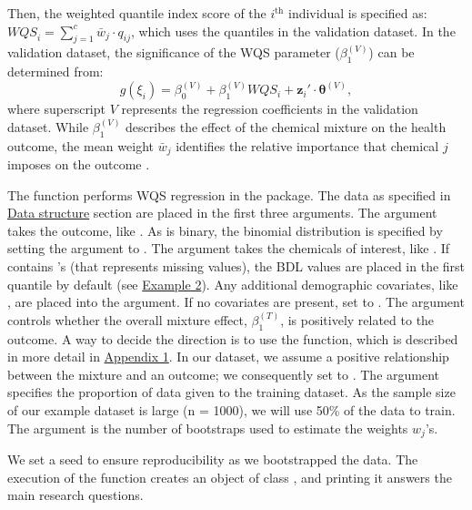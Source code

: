 Then, the weighted quantile index score of the \(i^{\text{th}}\)
individual is specified as:
\({WQS}_{i} = \sum_{j=1}^{c} \bar w_j \cdot q_{ij}\), which uses the
quantiles in the validation dataset. In the validation dataset, the
significance of the WQS parameter (\(\beta_{1}^{(V)}\)) can be
determined from:
\[ g(\xi_{i}) = \beta_{0}^{(V)} + \beta_{1}^{(V)} WQS_i + \boldsymbol{z}_i' \cdot \boldsymbol{\theta}^{(V)}, \]
where superscript \(V\) represents the regression coefficients in the
validation dataset. While \(\beta_{1}^{(V)}\) describes the effect of
the chemical mixture on the health outcome, the mean weight \(\bar w_j\)
identifies the relative importance that chemical \(j\) imposes on the
outcome
\citep{carricoCharacterizationWeightedQuantile2014, czarnotaAssessmentWeightedQuantile2015, genningsCohortStudyEvaluation2013, hargartenAccountingUncertaintyDue2020}.

The  function performs WQS regression in the
 package. The data as specified in
\protect\hyperlink{Data-structure}{Data structure} section are placed in
the first three arguments. The  argument takes the outcome, like
. As  is binary, the
binomial distribution is specified by setting the  argument
to . The  argument takes the chemicals of
interest, like . If  contains
's (that represents missing values), the BDL values are placed
in the first quantile by default (see
\protect\hyperlink{Example-2}{Example 2}). Any additional demographic
covariates, like , are placed into the 
argument. If no covariates are present, set  to . The
 argument controls whether the overall mixture effect,
\(\beta_1^{(T)}\), is positively related to the outcome. A way to decide
the direction is to use the  function,
which is described in more detail in
\protect\hyperlink{Appendix-1}{Appendix 1}. In our dataset, we assume a
positive relationship between the mixture and an outcome; we
consequently set  to . The
 argument specifies the proportion of data given
to the training dataset. As the sample size of our example dataset is
large (n = 1000), we will use 50\% of the data to train. The 
argument is the number of bootstraps used to estimate the weights
\(w_j\)'s.

We set a seed to ensure reproducibility as we bootstrapped the data. The
execution of the  function creates an object of
class , and printing it answers the main research questions.


